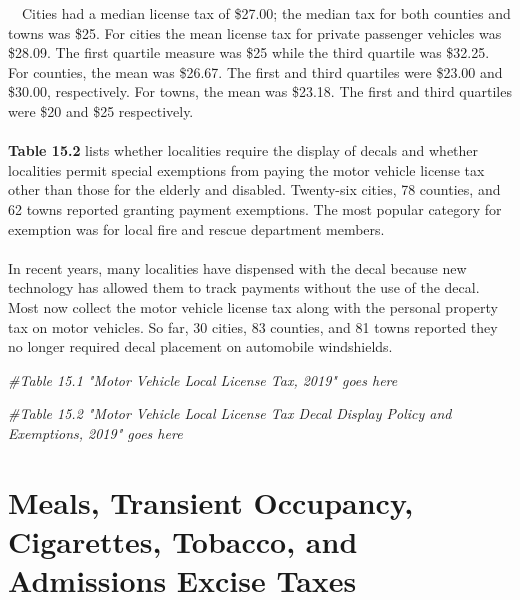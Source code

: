 \documentclass[
]{book}
\newenvironment{Shaded}{\begin{snugshade}}{\end{snugshade}}
\newcommand{\CommentTok}[1]{\textcolor[rgb]{0.56,0.35,0.01}{\textit{#1}}}
\begin{document}
\hfill\break
~~Cities had a median license tax of \$27.00; the median tax for both counties and towns was \$25. For cities the mean license tax for private passenger vehicles was \$28.09. The first quartile measure was \$25 while the third quartile was \$32.25. For counties, the mean was \$26.67. The first and third quartiles were \$23.00 and \$30.00, respectively. For towns, the mean was \$23.18. The first and third quartiles were \$20 and \$25 respectively.\\
~\\
\hspace*{0.333em}\hspace*{0.333em}\textbf{Table 15.2} lists whether localities require the display of decals and whether localities permit special exemptions from paying the motor vehicle license tax other than those for the elderly and disabled. Twenty-six cities, 78 counties, and 62 towns reported granting payment exemptions. The most popular category for exemption was for local fire and rescue department members.\\
~\\
\hspace*{0.333em}\hspace*{0.333em}In recent years, many localities have dispensed with the decal because new technology has allowed them to track payments without the use of the decal. Most now collect the motor vehicle license tax along with the personal property tax on motor vehicles. So far, 30 cities, 83 counties, and 81 towns reported they no longer required decal placement on automobile windshields.\\

\begin{Shaded}
\begin{Highlighting}[]
\CommentTok{\#Table 15.1 "Motor Vehicle Local License Tax, 2019" goes here}

\CommentTok{\#Table 15.2 "Motor Vehicle Local License Tax Decal Display Policy and Exemptions, 2019" goes here}
\end{Highlighting}
\end{Shaded}

\hypertarget{meals-transient-occupancy-cigarettes-tobacco-and-admissions-excise-taxes}{%
\chapter{Meals, Transient Occupancy, Cigarettes, Tobacco, and Admissions Excise Taxes}\label{meals-transient-occupancy-cigarettes-tobacco-and-admissions-excise-taxes}}
\end{document}
